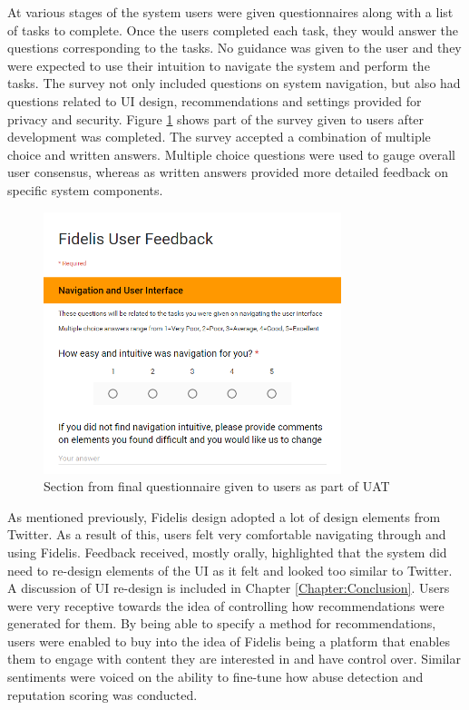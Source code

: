 At various stages of the system users were given questionnaires along with a list of tasks to complete. Once the users completed each task, they would answer the questions corresponding to the tasks. No guidance was given to the user and they were expected to use their intuition to navigate the system and perform the tasks. The survey not only included questions on system navigation, but also had questions related to UI design, recommendations and settings provided for privacy and security. Figure \ref{fig:UATQuestionnaire} shows part of the survey given to users after development was completed. The survey accepted a combination of multiple choice and written answers. Multiple choice questions were used to gauge overall user consensus, whereas as written answers provided more detailed feedback on specific system components.

\begin{figure}[H]
\centering
\includegraphics[height=3in]{Images/Testing/UATQuestionnaire}
\caption{Section from final questionnaire given to users as part of UAT}
\label{fig:UATQuestionnaire}
\end{figure}

As mentioned previously, Fidelis design adopted a lot of design elements from Twitter. As a result of this, users felt very comfortable navigating through and using Fidelis. Feedback received, mostly orally, highlighted that the system did need to re-design elements of the UI as it felt and looked too similar to Twitter. A discussion of UI re-design is included in Chapter \ref{Chapter:Conclusion}. Users were very receptive towards the idea of controlling how recommendations were generated for them. By being able to specify a method for recommendations, users were enabled to buy into the idea of Fidelis being a platform that enables them to engage with content they are interested in and have control over. Similar sentiments were voiced on the ability to fine-tune how abuse detection and reputation scoring was conducted.

